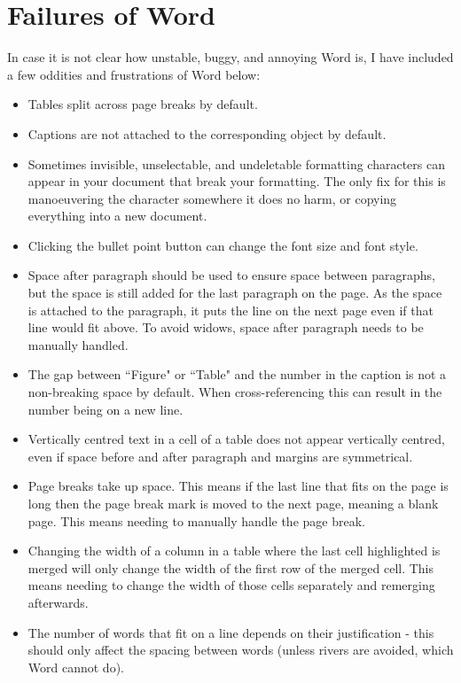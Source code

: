 \section{Failures of Word}

In case it is not clear how unstable, buggy, and annoying Word is, I have included a few oddities and frustrations of Word below:

\begin{itemize}
	\item Tables split across page breaks by default.
	\item Captions are not attached to the corresponding object by default.
	\item Sometimes invisible, unselectable, and undeletable formatting characters can appear in your document that break your formatting. The only fix for this is manoeuvering the character somewhere it does no harm, or copying everything into a new document.
	\item Clicking the bullet point button can change the font size and font style.
	\item Space after paragraph should be used to ensure space between paragraphs, but the space is still added for the last paragraph on the page. As the space is attached to the paragraph, it puts the line on the next page even if that line would fit above. To avoid widows, space after paragraph needs to be manually handled.
	\item The gap between ``Figure" or ``Table" and the number in the caption is not a non-breaking space by default. When cross-referencing this can result in the number being on a new line.
	\item Vertically centred text in a cell of a table does not appear vertically centred, even if space before and after paragraph and margins are symmetrical.
	\item Page breaks take up space. This means if the last line that fits on the page is long then the page break mark is moved to the next page, meaning a blank page. This means needing to manually handle the page break.
	\item Changing the width of a column in a table where the last cell highlighted is merged will only change the width of the first row of the merged cell. This means needing to change the width of those cells separately and remerging afterwards.
	\item The number of words that fit on a line depends on their justification - this should only affect the spacing between words (unless rivers are avoided, which Word cannot do).
\end{itemize}